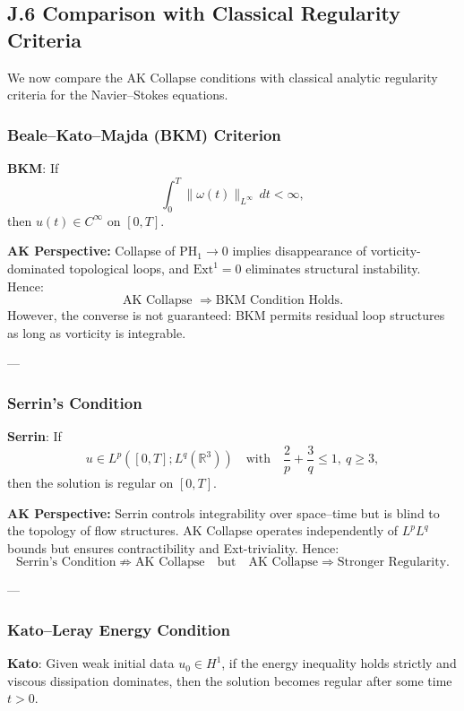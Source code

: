 \documentclass[11pt]{article}
\theoremstyle{definition}
\begin{document}
\subsection*{J.6 Comparison with Classical Regularity Criteria}

We now compare the AK Collapse conditions with classical analytic regularity criteria for the Navier–Stokes equations.

\subsubsection*{Beale–Kato–Majda (BKM) Criterion}

\textbf{BKM}:  
If
\[
\int_0^T \|\omega(t)\|_{L^\infty} \, dt < \infty,
\]
then \( u(t) \in C^\infty \) on \( [0, T] \).

\textbf{AK Perspective:}  
Collapse of \( \mathrm{PH}_1 \to 0 \) implies disappearance of vorticity-dominated topological loops, and \( \mathrm{Ext}^1 = 0 \) eliminates structural instability.  
Hence:
\[
\text{AK Collapse } \Rightarrow \text{BKM Condition Holds}.
\]
However, the converse is not guaranteed: BKM permits residual loop structures as long as vorticity is integrable.

---

\subsubsection*{Serrin’s Condition}

\textbf{Serrin}:  
If
\[
u \in L^p([0,T]; L^q(\mathbb{R}^3)) \quad \text{with} \quad \frac{2}{p} + \frac{3}{q} \leq 1,\ q \geq 3,
\]
then the solution is regular on \( [0,T] \).

\textbf{AK Perspective:}  
Serrin controls integrability over space–time but is blind to the topology of flow structures.  
AK Collapse operates independently of \( L^pL^q \) bounds but ensures contractibility and Ext-triviality.  
Hence:
\[
\text{Serrin's Condition} \not\Rightarrow \text{AK Collapse} \quad \text{but} \quad \text{AK Collapse} \Rightarrow \text{Stronger Regularity}.
\]

---

\subsubsection*{Kato–Leray Energy Condition}

\textbf{Kato}:  
Given weak initial data \( u_0 \in H^1 \), if the energy inequality holds strictly and viscous dissipation dominates, then the solution becomes regular after some time \( t > 0 \).
\end{document}
